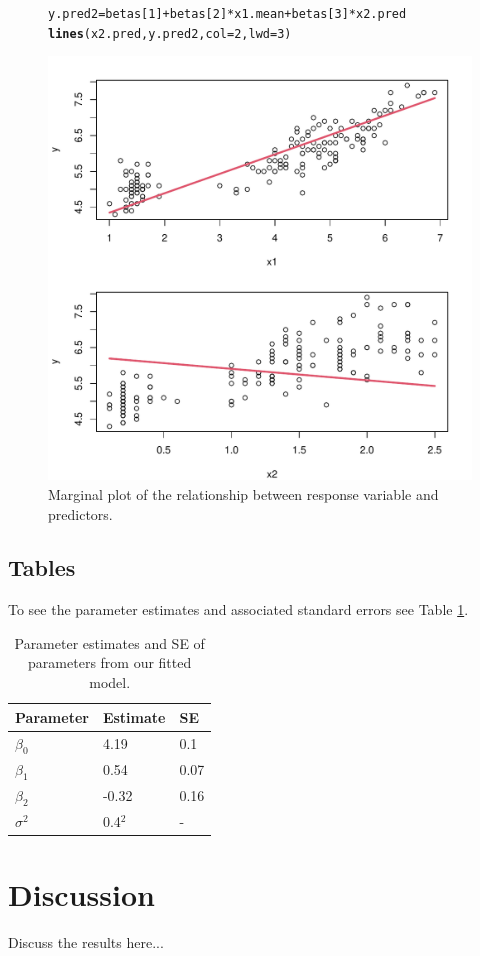 \documentclass{article}\usepackage[]{graphicx}\usepackage[]{color}
\makeatletter
\def\maxwidth{ %
  \ifdim\Gin@nat@width>\linewidth
    \linewidth
  \else
    \Gin@nat@width
  \fi
}
\newcommand{\hlnum}[1]{\textcolor[rgb]{0.686,0.059,0.569}{#1}}%
\newcommand{\hlopt}[1]{\textcolor[rgb]{0,0,0}{#1}}%
\newcommand{\hlstd}[1]{\textcolor[rgb]{0.345,0.345,0.345}{#1}}%
\newcommand{\hlkwb}[1]{\textcolor[rgb]{0.69,0.353,0.396}{#1}}%
\newcommand{\hlkwc}[1]{\textcolor[rgb]{0.333,0.667,0.333}{#1}}%
\newcommand{\hlkwd}[1]{\textcolor[rgb]{0.737,0.353,0.396}{\textbf{#1}}}%
\newenvironment{kframe}{%
 \def\at@end@of@kframe{}%
 \ifinner\ifhmode%
  \def\at@end@of@kframe{\end{minipage}}%
  \begin{minipage}{\columnwidth}%
 \fi\fi%
 \def\FrameCommand##1{\hskip\@totalleftmargin \hskip-\fboxsep
 \colorbox{shadecolor}{##1}\hskip-\fboxsep
     \hskip-\linewidth \hskip-\@totalleftmargin \hskip\columnwidth}%
 \MakeFramed {\advance\hsize-\width
   \@totalleftmargin\z@ \linewidth\hsize
   \@setminipage}}%
 {\par\unskip\endMakeFramed%
 \at@end@of@kframe}
\newenvironment{knitrout}{}{} %
\makeatother
\begin{document}
\begin{figure}
\begin{knitrout}
\begin{kframe}
\begin{alltt}
\hlstd{y.pred2}\hlkwb{=}\hlstd{betas[}\hlnum{1}\hlstd{]}\hlopt{+}\hlstd{betas[}\hlnum{2}\hlstd{]}\hlopt{*}\hlstd{x1.mean}\hlopt{+}\hlstd{betas[}\hlnum{3}\hlstd{]}\hlopt{*}\hlstd{x2.pred}
\hlkwd{lines}\hlstd{(x2.pred,y.pred2,}\hlkwc{col}\hlstd{=}\hlnum{2}\hlstd{,}\hlkwc{lwd}\hlstd{=}\hlnum{3}\hlstd{)}
\end{alltt}
\end{kframe}
\includegraphics[width=\maxwidth]{figure/chunk2-1} 

\end{knitrout}

\caption{Marginal plot of the relationship between response variable and predictors.}
\label{fig:marginals}
\end{figure}

\subsection{Tables}
To see the parameter estimates and associated standard errors see Table \ref{tab:estimates}.

\begin{table}[H]
\caption{Parameter estimates and SE of parameters from our fitted model.}
\begin{tabular}[t]{ l l l }
\hline
Parameter & Estimate & SE \\
\hline
 $\beta_0$ & 4.19 & 0.1 \\ 
 $\beta_1$ & 0.54 & 0.07 \\  
 $\beta_2$ & -0.32 & 0.16 \\
 $\sigma^2$ & 0.4$^2$ & - \\
 \hline
 \end{tabular}
\label{tab:estimates}
\end{table}

\section{Discussion}
Discuss the results here...
\end{document}
